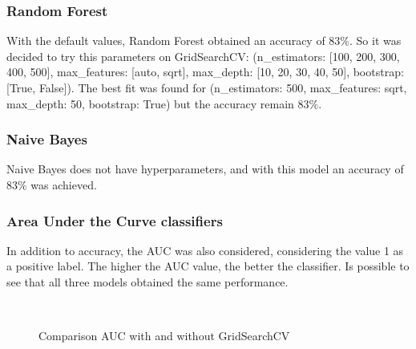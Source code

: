 \documentclass{article}
\begin{document}
\subsubsection{Random Forest}
With the default values, Random Forest obtained an accuracy of $83\%$. So it was decided to try this parameters on GridSearchCV: (n\_estimators: [100, 200, 300, 400, 500], max\_features: [auto, sqrt], max\_depth: [10, 20, 30, 40, 50], bootstrap: [True, False]). The best fit was found for (n\_estimators: 500, max\_features: sqrt, max\_depth: 50, bootstrap: True) but the accuracy remain $83\%$.
\subsubsection{Naive Bayes}
Naive Bayes does not have hyperparameters, and with this model an accuracy of $83\%$ was achieved.
\subsubsection{Area Under the Curve classifiers}
In addition to accuracy, the AUC was also considered, considering the value 1 as a positive label. The higher the AUC value, the better the classifier. Is possible to see that all three models obtained the same performance.
\begin{figure}[h!]
\centering
{} \quad
{} \\
\caption{Comparison AUC with and without GridSearchCV}
\label{fig:subfig}
\end{figure}
\label{section: ExperimentalEvaluation}
\end{document}

